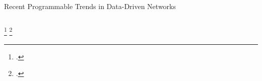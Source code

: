 \documentclass[aspectratio=169,xcolor={dvipsnames}
,handout
]{beamer}
\begin{document}
\begin{frame}{Recent Programmable Trends in Data-Driven Networks}
\begin{columns}
\begin{column}{0.4\linewidth}
		\end{column}
	\end{columns}
\setcounter{footnote}{1}
\footcitetext{DBLP:journals/corr/abs-2009-02353}
\setcounter{footnote}{2}
\footcitetext{DBLP:conf/hotnets/XiongZ19}
\end{frame}
\end{document}

